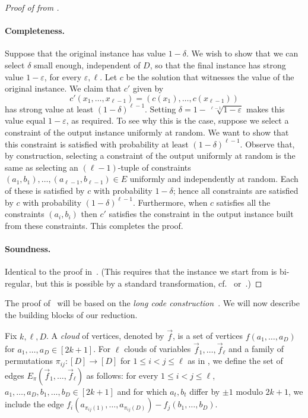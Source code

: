 \documentclass[a4paper,11pt, DIV=11]{scrartcl}
\renewcommand{\epsilon}{\varepsilon}
\theoremstyle{plain}
\theoremstyle{definition}
\begin{document}
\begin{proof}[{Proof of  from }]
\paragraph{Completeness.} Suppose that the original instance has value $1 -
  \delta$. We wish to show that we can select $\delta$ small enough, independent of $D$, so that the final instance has strong value $1 - \epsilon$, for every $\epsilon, \ell$. Let $c$ be the solution that witnesses the value of the original instance. We claim that $c'$ given by
\[
c'(x_1, \ldots, x_{\ell - 1}) = (c(x_1), \ldots, c(x_{\ell - 1}))
\]
has strong value at least $(1 - \delta)^{\ell - 1}$. Setting $\delta = 1 -
  \sqrt[\ell - 1]{1 - \epsilon}$ makes this value equal $1 - \epsilon$, as
  required. To see why this is the case, suppose we select a constraint of the
  output instance uniformly at random. We want to show that this constraint is
  satisfied with probability at least $(1 - \delta)^{\ell - 1}$. Observe that,
  by construction, selecting a constraint of the output uniformly at random is
  the same as selecting an $(\ell - 1)$-tuple of constraints $(a_1, b_1),
  \ldots, (a_{\ell - 1}, b_{\ell -1}) \in E$ uniformly and independently at
  random. Each of these is satisfied by $c$ with probability $1 - \delta$; hence
  all constraints are satisfied by $c$ with probability $(1 - \delta)^{\ell - 1}$. Furthermore, when $c$ satisfies all the constraints $(a_i, b_i)$ then 
 $c'$ satisfies the constraint in the output instance built from these constraints. This completes the proof.

\paragraph{Soundness.} Identical to the proof in~\cite{BWZ21}. (This requires that the \UGC{} instance we start from is bi-regular, but this is possible by a standard transformation, cf.~\cite{Khot12:ccc-survey} or~\cite{Arora09:book,DinurGKR05}.)
\end{proof}

The proof of~ will be based on the \emph{long code
construction}~\cite{BGS:98}. We will now describe the building blocks of our reduction.

\begin{definition}
    Fix $k, \ell, D$. A \emph{cloud} of vertices, denoted by $\vec{f}$, is a set of vertices $f(a_1, \ldots, a_D)$ for $a_1, \ldots, a_D \in [2k + 1]$. For $\ell$ clouds of variables $\vec{f}_1, \ldots, \vec{f}_\ell$ and a family of permutations $\pi_{ij} : [D] \to [D]$ for $1 \leq i < j \leq \ell$ as in , we define the set of edges $E_\pi(\vec{f}_1, \ldots, \vec{f}_\ell)$ as follows: for every $1 \leq i < j \leq \ell$, $a_1, \ldots, a_D, b_1, \ldots, b_D \in [2k + 1]$ and for which $a_t, b_t$ differ by $\pm 1$ modulo $2k + 1$, we include the edge $f_i(a_{\pi_{ij}(1)}, \ldots, a_{\pi_{ij}(D)}) - f_j(b_1, \ldots, b_D)$.
\end{definition}
\end{document}
